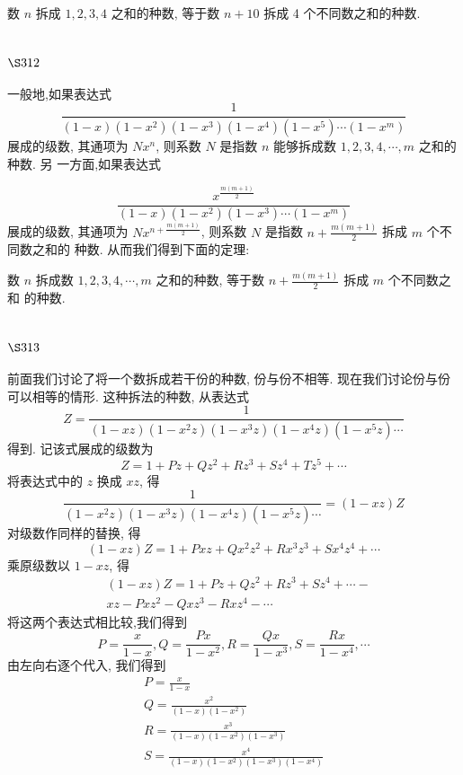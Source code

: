 数 $n$ 拆成 $1,2,3,4$ 之和的种数, 等于数 $n+10$ 拆成 4 个不同数之和的种数.

\section{$\S 312$}

一般地,如果表达式
\[
\frac{1}{(1-x)\left(1-x^{2}\right)\left(1-x^{3}\right)\left(1-x^{4}\right)\left(1-x^{5}\right) \cdots\left(1-x^{m}\right)}
\]
展成的级数, 其通项为 $N x^{n}$, 则系数 $N$ 是指数 $n$ 能够拆成数 $1,2,3,4, \cdots, m$ 之和的种数. 另 一方面,如果表达式

\[
\frac{x^{\frac{m(m+1)}{2}}}{(1-x)\left(1-x^2\right)\left(1-x^3\right) \cdots\left(1-x^m\right)}
\]
展成的级数, 其通项为 $N x^{n+\frac{m(m+1)}{2}}$, 则系数 $N$ 是指数 $n+\frac{m(m+1)}{2}$ 拆成 $m$ 个不同数之和的 种数. 从而我们得到下面的定理:

数 $n$ 拆成数 $1,2,3,4, \cdots, m$ 之和的种数, 等于数 $n+\frac{m(m+1)}{2}$ 拆成 $m$ 个不同数之和 的种数.

\section{$\S 313$}

前面我们讨论了将一个数拆成若干份的种数, 份与份不相等. 现在我们讨论份与份 可以相等的情形. 这种拆法的种数, 从表达式
\[
Z=\frac{1}{(1-x z)\left(1-x^{2} z\right)\left(1-x^{3} z\right)\left(1-x^{4} z\right)\left(1-x^{5} z\right) \cdots}
\]
得到. 记该式展成的级数为
\[
Z=1+P z+Q z^{2}+R z^{3}+S z^{4}+T z^{5}+\cdots
\]
将表达式中的 $z$ 换成 $x z$, 得
\[
\frac{1}{\left(1-x^{2} z\right)\left(1-x^{3} z\right)\left(1-x^{4} z\right)\left(1-x^{5} z\right) \cdots}=(1-x z) Z
\]
对级数作同样的替换, 得
\[
(1-x z) Z=1+P x z+Q x^{2} z^{2}+R x^{3} z^{3}+S x^{4} z^{4}+\cdots
\]
乘原级数以 $1-x z$, 得 
\[
\begin{aligned}
& (1-x z) Z=1+P z+Q z^{2}+R z^{3}+S z^{4}+\cdots- \\
& x z-P x z^{2}-Q x z^{3}-R x z^{4}-\cdots
\end{aligned}
\]
将这两个表达式相比较,我们得到
\[
P=\frac{x}{1-x}, Q=\frac{P x}{1-x^{2}}, R=\frac{Q x}{1-x^{3}}, S=\frac{R x}{1-x^{4}}, \cdots
\]
由左向右逐个代入, 我们得到
\[
\begin{gathered}
P=\frac{x}{1-x} \\
Q=\frac{x^{2}}{(1-x)\left(1-x^{2}\right)} \\
R=\frac{x^{3}}{(1-x)\left(1-x^{2}\right)\left(1-x^{3}\right)} \\
S=\frac{x^{4}}{(1-x)\left(1-x^{2}\right)\left(1-x^{3}\right)\left(1-x^{4}\right)}
\end{gathered}
\]
